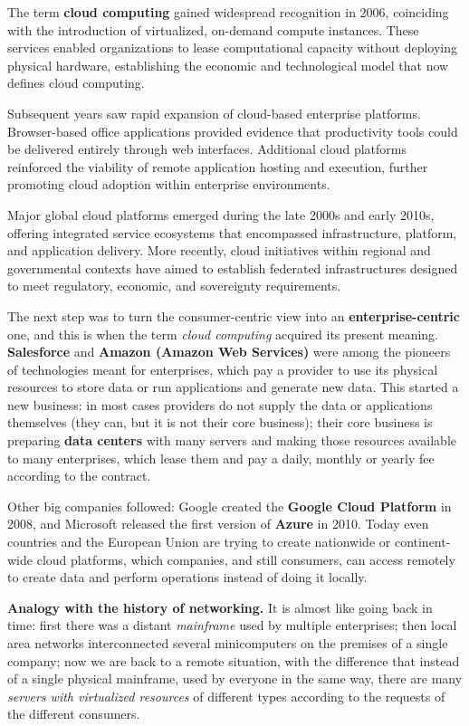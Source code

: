 The term \textbf{cloud computing} gained widespread recognition in 2006, coinciding with the introduction of virtualized, on-demand compute instances. These services enabled organizations to lease computational capacity without deploying physical hardware, establishing the economic and technological model that now defines cloud computing.

Subsequent years saw rapid expansion of cloud-based enterprise platforms. Browser-based office applications provided evidence that productivity tools could be delivered entirely through web interfaces. Additional cloud platforms reinforced the viability of remote application hosting and execution, further promoting cloud adoption within enterprise environments.

Major global cloud platforms emerged during the late 2000s and early 2010s, offering integrated service ecosystems that encompassed infrastructure, platform, and application delivery. More recently, cloud initiatives within regional and governmental contexts have aimed to establish federated infrastructures designed to meet regulatory, economic, and sovereignty requirements.

The next step was to turn the consumer-centric view into an \textbf{enterprise-centric} one, and this is when the term \emph{cloud computing} acquired its present meaning. \textbf{Salesforce} and \textbf{Amazon (Amazon Web Services)} were among the pioneers of technologies meant for enterprises, which pay a provider to use its physical resources to store data or run applications and generate new data. This started a new business: in most cases providers do not supply the data or applications themselves (they can, but it is not their core business); their core business is preparing \textbf{data centers} with many servers and making those resources available to many enterprises, which lease them and pay a daily, monthly or yearly fee according to the contract.

Other big companies followed: Google created the \textbf{Google Cloud Platform} in 2008, and Microsoft released the first version of \textbf{Azure} in 2010. Today even countries and the European Union are trying to create nationwide or continent-wide cloud platforms, which companies, and still consumers, can access remotely to create data and perform operations instead of doing it locally.

\begin{notebox}
	\textbf{Analogy with the history of networking.} It is almost like going back in time: first there was a distant \emph{mainframe} used by multiple enterprises; then local area networks interconnected several minicomputers on the premises of a single company; now we are back to a remote situation, with the difference that instead of a single physical mainframe, used by everyone in the same way, there are many \emph{servers with virtualized resources} of different types according to the requests of the different consumers.
\end{notebox} 


